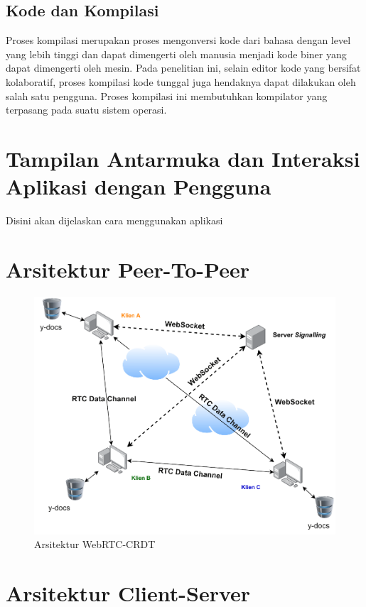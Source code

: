 \subsection{Kode dan Kompilasi}

Proses kompilasi merupakan proses mengonversi kode dari bahasa dengan level yang lebih tinggi dan dapat dimengerti oleh manusia menjadi kode biner yang dapat dimengerti oleh mesin. Pada penelitian ini, selain editor kode yang bersifat kolaboratif, proses kompilasi kode tunggal juga hendaknya dapat dilakukan oleh salah satu pengguna. Proses kompilasi ini membutuhkan kompilator yang terpasang pada suatu sistem operasi.

\section{Tampilan Antarmuka dan Interaksi Aplikasi dengan Pengguna}

Disini akan dijelaskan cara menggunakan aplikasi

\section{Arsitektur Peer-To-Peer}

\begin{figure}
    \centering
    \includegraphics[scale=0.6]{assets/skripsi/Arsitektur_WebRTC_CRDT}
    \caption{Arsitektur WebRTC-CRDT}
\end{figure}

\section{Arsitektur Client-Server}

